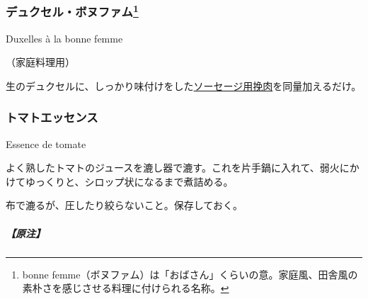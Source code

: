 \begin{recette}
\atoaki{}

\hypertarget{duxelles-bonne-femme}{%
\subsubsection[デュクセル・ボヌファム]{\texorpdfstring{デュクセル・ボヌファム\footnote{bonne
  femme（ボヌファム）は「おばさん」くらいの意。家庭風、田舎風の素朴さを感じさせる料理に付けられる名称。}}{デュクセル・ボヌファム}}\label{duxelles-bonne-femme}}

\begin{frsubenv}

Duxelles à la bonne femme

\end{frsubenv}


（家庭料理用）

生のデュクセルに、しっかり味付けをした\protect\hyperlink{chair-a-saucisse}{ソーセージ用挽肉}を同量加えるだけ。

\atoaki{}

\hypertarget{essence-de-tomate}{%
\subsubsection{トマトエッセンス}\label{essence-de-tomate}}

\begin{frsubenv}

Essence de tomate

\end{frsubenv}


よく熟したトマトのジュースを漉し器で漉す。これを片手鍋に入れて、弱火にかけてゆっくりと、シロップ状になるまで煮詰める。

布で漉るが、圧したり絞らないこと。保存しておく。

\hypertarget{nota-essence-de-tomate}{%
\subparagraph{【原注】}\label{nota-essence-de-tomate}}


\end{recette}
